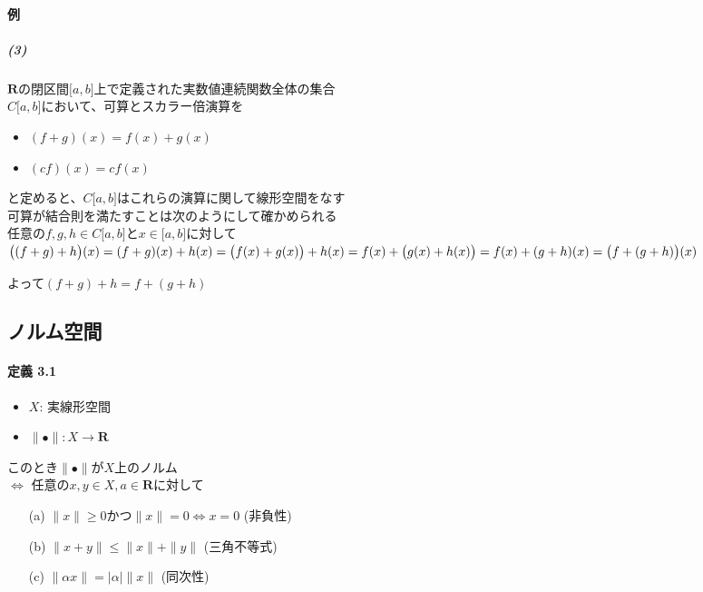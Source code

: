 \documentclass[12pt,a4paper]{article}
\begin{document}
  \paragraph{例}
    \subparagraph{(3)}
      $\mathbf{R}$の閉区間$\lbrack a, b \rbrack$上で定義された実数値連続関数全体の集合 \\
      $C\lbrack a, b \rbrack$において、可算とスカラー倍演算を
      \begin{itemize}
        \item $(f + g) (x) = f( x) + g (x)$
        \item $(cf) (x) = c f (x)$
      \end{itemize}
      と定めると、$C\lbrack a, b \rbrack$はこれらの演算に関して線形空間をなす \\
      可算が結合則を満たすことは次のようにして確かめられる \\
      任意の$f, g, h \in C \lbrack a, b \rbrack$と$x \in \lbrack a, b \rbrack$に対して \\
      \begin{math}
        \big( (f + g) + h \big) (x) = (f + g) (x) + h(x) \\
        =  \big(f(x) + g(x) \big) + h(x) \\
        = f(x) + \big(g(x) + h(x)\big) \\
        = f(x) + (g + h) (x) \\
      = \big(f+ (g + h) \big) (x) \end{math}
      
      よって$(f+ g) + h = f + (g + h)$
  \setcounter{section}{3}
  \subsection{ノルム空間}
    \paragraph{定義 3.1}
    \begin{itemize}
      \item $X$: 実線形空間
      \item $\parallel \bullet \parallel : X \rightarrow \mathbf{R}$
    \end{itemize}
    
    このとき$\parallel \bullet \parallel$が$X$上のノルム \\
    $\Leftrightarrow$ 任意の$x, y \in X, a \in \mathbf{R}$に対して \\
    \begin{itemize}
      \item[(a)] $\parallel x \parallel \geq 0$かつ$\parallel x \parallel = 0 \Leftrightarrow x = 0$ (非負性)
      \item[(b)] $\parallel x + y \parallel \leq \parallel x \parallel + \parallel y \parallel$ (三角不等式)
      \item[(c)] $\parallel \alpha x \parallel = \mid\alpha\mid \parallel x \parallel$ (同次性)
    \end{itemize}
    
\end{document}
